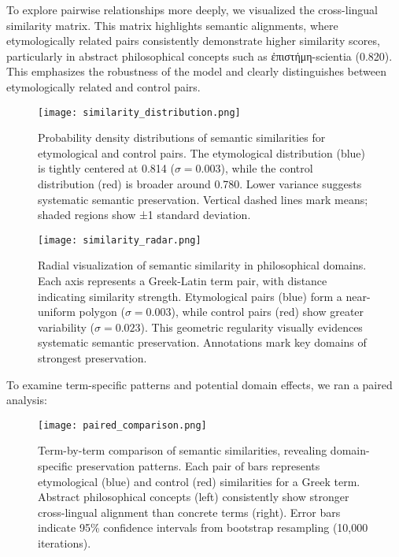 \documentclass[11pt]{article} %
\begin{document}
To explore pairwise relationships more deeply, we visualized the cross-lingual similarity matrix. This matrix highlights semantic alignments, where etymologically related pairs consistently demonstrate higher similarity scores, particularly in abstract philosophical concepts such as \textgreek{ἐπιστήμη}-scientia (0.820). This emphasizes the robustness of the model and clearly distinguishes between etymologically related and control pairs.

\begin{figure}[!htb]
\centering
\texttt{[image: similarity\_distribution.png]}
\caption{Probability density distributions of semantic similarities for etymological and control pairs. The etymological distribution (blue) is tightly centered at 0.814 ($\sigma = 0.003$), while the control distribution (red) is broader around 0.780. Lower variance suggests systematic semantic preservation. Vertical dashed lines mark means; shaded regions show ±1 standard deviation.}
\label{fig:distribution}
\end{figure}

\begin{figure}[!htb]
\centering
\texttt{[image: similarity\_radar.png]}
\caption{Radial visualization of semantic similarity in philosophical domains. Each axis represents a Greek-Latin term pair, with distance indicating similarity strength. Etymological pairs (blue) form a near-uniform polygon ($\sigma = 0.003$), while control pairs (red) show greater variability ($\sigma = 0.023$). This geometric regularity visually evidences systematic semantic preservation. Annotations mark key domains of strongest preservation.}
\label{fig:radar}
\end{figure}

To examine term-specific patterns and potential domain effects, we ran a paired analysis:

\begin{figure}[H]
\centering
\texttt{[image: paired\_comparison.png]}
\caption{Term-by-term comparison of semantic similarities, revealing domain-specific preservation patterns. Each pair of bars represents etymological (blue) and control (red) similarities for a Greek term. Abstract philosophical concepts (left) consistently show stronger cross-lingual alignment than concrete terms (right). Error bars indicate 95\% confidence intervals from bootstrap resampling (10,000 iterations).}
\label{fig:paired}
\end{figure}
\end{document}
